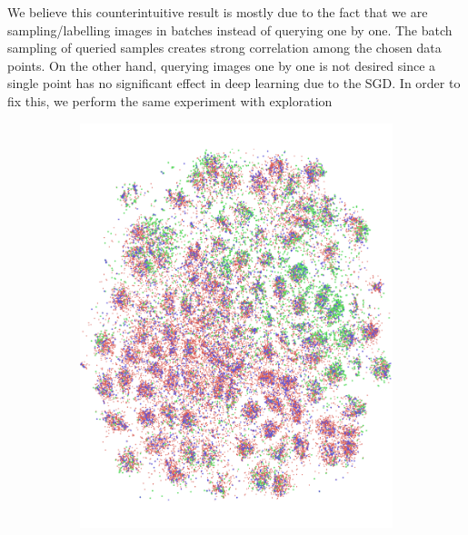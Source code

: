 \documentclass{article} %
\begin{document}
We believe this counterintuitive result is mostly due to the fact that we are sampling/labelling images in batches
instead of querying one by one. The batch sampling of queried samples creates strong correlation among the chosen data
points.  On the other hand, querying images one by one is not desired since a single point has no significant effect in
deep learning due to the SGD. In order to fix this, we perform the same experiment with
exploration%
    
    
\begin{figure}
\vspace{-5mm}
  \begin{center}
    \begin{subfigure}[b]{0.23\textwidth}
		\includegraphics[width=\columnwidth]{fig1_a_1.pdf}

\end{subfigure}
\end{center}
\end{figure}
\end{document}
